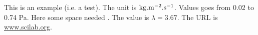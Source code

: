 This is an example (i.e. a test).  The unit is $\rm kg.m^{-2}.s^{-1}$.  Values goes from 0.02 to 0.74 Pa.  Here some space needed \hspace{0.5cm}.  The value is $\lambda=3.67$.  The URL is \url{www.scilab.org}.
